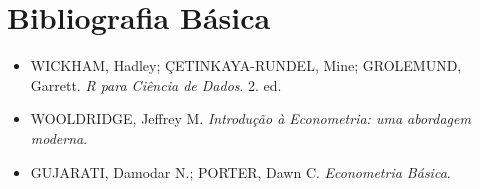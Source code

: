 \documentclass[12pt,a4paper]{article}
\begin{document}
	\section*{Bibliografia Básica}
	
	\begin{itemize}
		\item WICKHAM, Hadley; ÇETINKAYA-RUNDEL, Mine; GROLEMUND, Garrett. \textit{R para Ciência de Dados}. 2. ed.
		
		\item WOOLDRIDGE, Jeffrey M. \textit{Introdução à Econometria: uma abordagem moderna}.
		
		\item GUJARATI, Damodar N.; PORTER, Dawn C. \textit{Econometria Básica}.
	\end{itemize}
	
\end{document}
